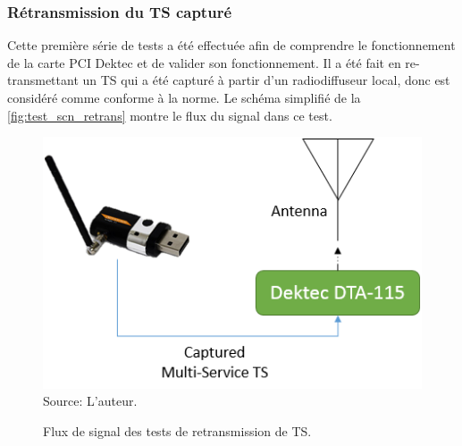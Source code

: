 \documentclass[12pt,a4paper]{article}
\begin{document}
\subsubsection{Rétransmission du TS capturé}
\label{retransmitting}

Cette première série de tests a été effectuée afin de comprendre le fonctionnement de la carte PCI Dektec et de valider son fonctionnement. Il a été fait en re-transmettant un TS qui a été capturé à partir d'un radiodiffuseur local, donc est considéré comme conforme à la norme. Le schéma simplifié de la \autoref{fig:test_scn_retrans} montre le flux du signal dans ce test.

\begin{figure}[!h]
\centering
\caption{Flux de signal des tests de retransmission de TS.}
\includegraphics[width=0.5\linewidth]{pictures/test_scn_retrans.png}
\\Source: L'auteur.
\label{fig:test_scn_retrans}
\end{figure}



\end{document}

